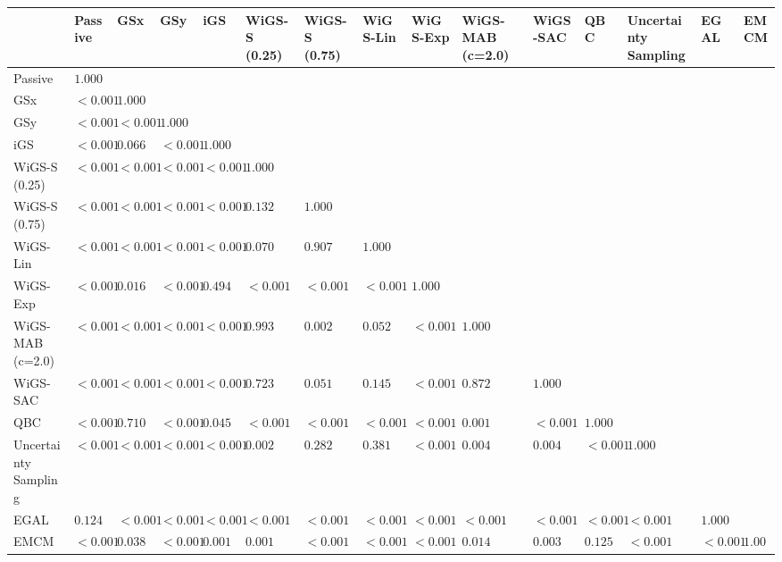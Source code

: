 \begin{tabular}{lllllllllllllll}
\toprule
 & Passive & GSx & GSy & iGS & WiGS-S (0.25) & WiGS-S (0.75) & WiGS-Lin & WiGS-Exp & WiGS-MAB (c=2.0) & WiGS-SAC & QBC & Uncertainty Sampling & EGAL & EMCM \\
\midrule
Passive & $1.000$ &  &  &  &  &  &  &  &  &  &  &  &  &  \\
GSx & $<0.001$ & $1.000$ &  &  &  &  &  &  &  &  &  &  &  &  \\
GSy & $<0.001$ & $<0.001$ & $1.000$ &  &  &  &  &  &  &  &  &  &  &  \\
iGS & $<0.001$ & $0.066$ & $<0.001$ & $1.000$ &  &  &  &  &  &  &  &  &  &  \\
WiGS-S (0.25) & $<0.001$ & $<0.001$ & $<0.001$ & $<0.001$ & $1.000$ &  &  &  &  &  &  &  &  &  \\
WiGS-S (0.75) & $<0.001$ & $<0.001$ & $<0.001$ & $<0.001$ & $0.132$ & $1.000$ &  &  &  &  &  &  &  &  \\
WiGS-Lin & $<0.001$ & $<0.001$ & $<0.001$ & $<0.001$ & $0.070$ & $0.907$ & $1.000$ &  &  &  &  &  &  &  \\
WiGS-Exp & $<0.001$ & $0.016$ & $<0.001$ & $0.494$ & $<0.001$ & $<0.001$ & $<0.001$ & $1.000$ &  &  &  &  &  &  \\
WiGS-MAB (c=2.0) & $<0.001$ & $<0.001$ & $<0.001$ & $<0.001$ & $0.993$ & $0.002$ & $0.052$ & $<0.001$ & $1.000$ &  &  &  &  &  \\
WiGS-SAC & $<0.001$ & $<0.001$ & $<0.001$ & $<0.001$ & $0.723$ & $0.051$ & $0.145$ & $<0.001$ & $0.872$ & $1.000$ &  &  &  &  \\
QBC & $<0.001$ & $0.710$ & $<0.001$ & $0.045$ & $<0.001$ & $<0.001$ & $<0.001$ & $<0.001$ & $0.001$ & $<0.001$ & $1.000$ &  &  &  \\
Uncertainty Sampling & $<0.001$ & $<0.001$ & $<0.001$ & $<0.001$ & $0.002$ & $0.282$ & $0.381$ & $<0.001$ & $0.004$ & $0.004$ & $<0.001$ & $1.000$ &  &  \\
EGAL & $0.124$ & $<0.001$ & $<0.001$ & $<0.001$ & $<0.001$ & $<0.001$ & $<0.001$ & $<0.001$ & $<0.001$ & $<0.001$ & $<0.001$ & $<0.001$ & $1.000$ &  \\
EMCM & $<0.001$ & $0.038$ & $<0.001$ & $0.001$ & $0.001$ & $<0.001$ & $<0.001$ & $<0.001$ & $0.014$ & $0.003$ & $0.125$ & $<0.001$ & $<0.001$ & $1.000$ \\
\bottomrule
\end{tabular}
